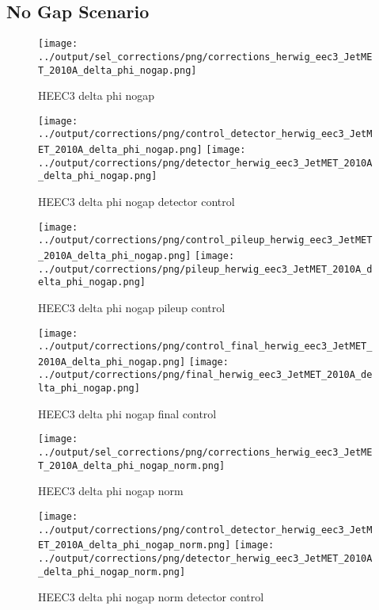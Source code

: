 \documentclass[11pt]{book}
\begin{document}
\clearpage
\subsection{No Gap Scenario}
\begin{figure}[ht]
\centering
\texttt{[image: ../output/sel\_corrections/png/corrections\_herwig\_eec3\_JetMET\_2010A\_delta\_phi\_nogap.png]}
\caption{HEEC3 delta phi nogap}
\label{fig:HEEC3_JetMET_2010A_delta_phi_nogap}
\end{figure}


\begin{figure}[ht]
\centering
\texttt{[image: ../output/corrections/png/control\_detector\_herwig\_eec3\_JetMET\_2010A\_delta\_phi\_nogap.png]}
\texttt{[image: ../output/corrections/png/detector\_herwig\_eec3\_JetMET\_2010A\_delta\_phi\_nogap.png]}
\caption{HEEC3 delta phi nogap detector control}
\label{fig:HEEC3_JetMET_2010A_delta_phi_nogap_detector_control}
\end{figure}

\begin{figure}[ht]
\centering
\texttt{[image: ../output/corrections/png/control\_pileup\_herwig\_eec3\_JetMET\_2010A\_delta\_phi\_nogap.png]}
\texttt{[image: ../output/corrections/png/pileup\_herwig\_eec3\_JetMET\_2010A\_delta\_phi\_nogap.png]}
\caption{HEEC3 delta phi nogap pileup control}
\label{fig:HEEC3_JetMET_2010A_delta_phi_nogap_pileup_control}
\end{figure}


\begin{figure}[ht]
\centering
\texttt{[image: ../output/corrections/png/control\_final\_herwig\_eec3\_JetMET\_2010A\_delta\_phi\_nogap.png]}
\texttt{[image: ../output/corrections/png/final\_herwig\_eec3\_JetMET\_2010A\_delta\_phi\_nogap.png]}
\caption{HEEC3 delta phi nogap final control}
\label{fig:HEEC3_JetMET_2010A_delta_phi_nogap_final_control}
\end{figure}


\begin{figure}[ht]
\centering
\texttt{[image: ../output/sel\_corrections/png/corrections\_herwig\_eec3\_JetMET\_2010A\_delta\_phi\_nogap\_norm.png]}
\caption{HEEC3 delta phi nogap norm}
\label{fig:HEEC3_JetMET_2010A_delta_phi_nogap_norm}
\end{figure}

\begin{figure}[ht]
\centering
\texttt{[image: ../output/corrections/png/control\_detector\_herwig\_eec3\_JetMET\_2010A\_delta\_phi\_nogap\_norm.png]}
\texttt{[image: ../output/corrections/png/detector\_herwig\_eec3\_JetMET\_2010A\_delta\_phi\_nogap\_norm.png]}
\caption{HEEC3 delta phi nogap norm detector control}
\label{fig:HEEC3_JetMET_2010A_delta_phi_nogap_norm_detector_control}
\end{figure}
\end{document}
